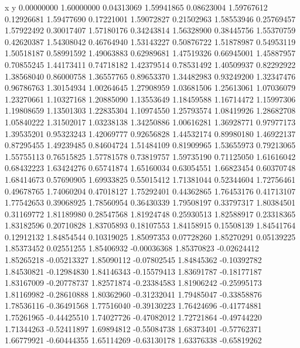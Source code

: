 x y
0.00000000   1.60000000  
0.04313069   1.59941865  
0.08623004   1.59767612  
0.12926681   1.59477690  
0.17221001   1.59072827  
0.21502963   1.58553946  
0.25769457   1.57922492  
0.30017407   1.57180176  
0.34243814   1.56328900  
0.38445756   1.55370759  
0.42620387   1.54308042  
0.46764940   1.53143227  
0.50876722   1.51878987  
0.54953119   1.50518187  
0.58991592   1.49063883  
0.62989681   1.47519326  
0.66945001   1.45887957  
0.70855245   1.44173411  
0.74718182   1.42379514  
0.78531492   1.40509937  
0.82292922   1.38568040  
0.86000758   1.36557765  
0.89653370   1.34482983  
0.93249200   1.32347476  
0.96786763   1.30154934  
1.00264645   1.27908959  
1.03681506   1.25613061  
1.07036079   1.23270661  
1.10327168   1.20885090  
1.13553649   1.18459588  
1.16714472   1.15997306  
1.19808659   1.13501303  
1.22835304   1.10974550  
1.25793574   1.08419926  
1.28682708   1.05840222  
1.31502017   1.03238138  
1.34250886   1.00616281  
1.36928771   0.97977173  
1.39535201   0.95323243  
1.42069777   0.92656828  
1.44532174   0.89980180  
1.46922137   0.87295455  
1.49239485   0.84604724  
1.51484109   0.81909965  
1.53655973   0.79213065  
1.55755113   0.76515825  
1.57781578   0.73819757  
1.59735190   0.71125050  
1.61616042   0.68432223  
1.63424276   0.65741874  
1.65160034   0.63054551  
1.66823454   0.60370748  
1.68414673   0.57690905  
1.69933825   0.55015412  
1.71381044   0.52344604  
1.72756461   0.49678765  
1.74060204   0.47018127  
1.75292401   0.44362865  
1.76453176   0.41713107  
1.77542653   0.39068925  
1.78560954   0.36430339  
1.79508197   0.33797317  
1.80384501   0.31169772  
1.81189980   0.28547568  
1.81924748   0.25930513  
1.82588917   0.23318365  
1.83182596   0.20710828  
1.83705893   0.18107553  
1.84158915   0.15508139  
1.84541764   0.12912132  
1.84854544   0.10319025  
1.85097353   0.07728260  
1.85270291   0.05139225  
1.85373452   0.02551255  
1.85406932   -0.00036368 
1.85370823   -0.02624412 
1.85265218   -0.05213327 
1.85090112   -0.07802545 
1.84845362   -0.10392782 
1.84530821   -0.12984830 
1.84146343   -0.15579413 
1.83691787   -0.18177187 
1.83167009   -0.20778737 
1.82571874   -0.23384583 
1.81906242   -0.25995173 
1.81169982   -0.28610888 
1.80362960   -0.31232041 
1.79485047   -0.33858876 
1.78536116   -0.36491568 
1.77516040   -0.39130223 
1.76424696   -0.41774881 
1.75261965   -0.44425510 
1.74027726   -0.47082012 
1.72721864   -0.49744220 
1.71344263   -0.52411897 
1.69894812   -0.55084738 
1.68373401   -0.57762371 
1.66779921   -0.60444355 
1.65114269   -0.63130178 
1.63376338   -0.65819262 
